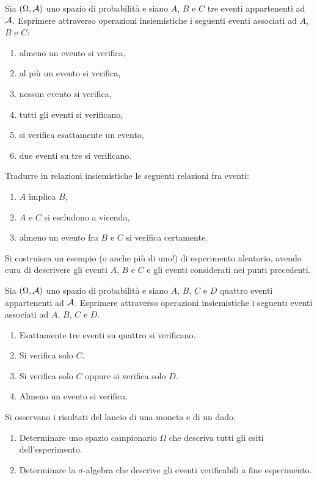 \Esercizio{}

Sia $(\Omega ,\mathcal{A})$ uno spazio di probabilità e siano $A$, $B$ e $C$ tre eventi appartenenti ad $\mathcal{A}$. Esprimere attraverso operazioni insiemistiche i seguenti eventi associati ad $A$, $B$ e $C$:
\begin{enumerate}
	\item almeno un evento si verifica,
	\item al più un evento si verifica,
	\item nessun evento si verifica,
	\item tutti gli eventi si verificano,
	\item si verifica esattamente un evento,
	\item due eventi su tre si verificano.
\end{enumerate}

Tradurre in relazioni insiemistiche le seguenti relazioni fra eventi:
\begin{enumerate}[resume]
	\item $A$ implica $B$,
	\item $A$ e $C$ si escludono a vicenda,
	\item almeno un evento fra $B$ e $C$ si verifica certamente.
\end{enumerate}

Si costruisca un esempio (o anche più di uno!) di esperimento aleatorio, avendo cura di descrivere gli eventi $A$, $B$ e $C$ e gli eventi considerati nei punti precedenti.

\Esercizio{}

Sia $(\Omega ,\mathcal{A})$ uno spazio di probabilità e siano $A$, $B$, $C$ e $D$ quattro eventi appartenenti ad $\mathcal{A}$. Esprimere attraverso operazioni insiemistiche i seguenti eventi associati ad $A$, $B$, $C$ e $D$.
\begin{enumerate}
	\item Esattamente tre eventi su quattro si verificano.
	\item Si verifica solo $C$.
	\item Si verifica solo $C$ oppure si verifica solo $D$.
	\item Almeno un evento si verifica.
\end{enumerate}

\Esercizio{}

Si osservano i risultati del lancio di una moneta e di un dado.
\begin{enumerate}
	\item Determinare uno spazio campionario $\Omega $ che descriva tutti gli esiti dell'esperimento.
	\item Determinare la $\sigma $-algebra che descrive gli eventi verificabili a fine esperimento.
\end{enumerate}

